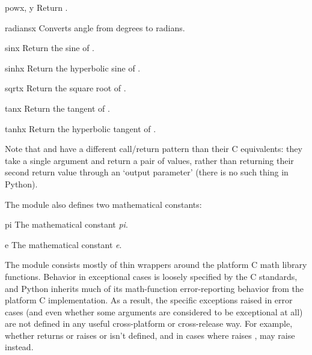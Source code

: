 \begin{funcdesc}{pow}{x, y}
Return .
\end{funcdesc}

\begin{funcdesc}{radians}{x}
Converts angle  from degrees to radians.
\end{funcdesc}

\begin{funcdesc}{sin}{x}
Return the sine of .
\end{funcdesc}

\begin{funcdesc}{sinh}{x}
Return the hyperbolic sine of .
\end{funcdesc}

\begin{funcdesc}{sqrt}{x}
Return the square root of .
\end{funcdesc}

\begin{funcdesc}{tan}{x}
Return the tangent of .
\end{funcdesc}

\begin{funcdesc}{tanh}{x}
Return the hyperbolic tangent of .
\end{funcdesc}

Note that  and  have a different
call/return pattern than their C equivalents: they take a single
argument and return a pair of values, rather than returning their
second return value through an `output parameter' (there is no such
thing in Python).

The module also defines two mathematical constants:

\begin{datadesc}{pi}
The mathematical constant \emph{pi}.
\end{datadesc}

\begin{datadesc}{e}
The mathematical constant \emph{e}.
\end{datadesc}

\begin{notice}
  The  module consists mostly of thin wrappers around
  the platform C math library functions.  Behavior in exceptional cases is
  loosely specified by the C standards, and Python inherits much of its
  math-function error-reporting behavior from the platform C
  implementation.  As a result,
  the specific exceptions raised in error cases (and even whether some
  arguments are considered to be exceptional at all) are not defined in any
  useful cross-platform or cross-release way.  For example, whether
   returns  or raises  or
   isn't defined, and in
  cases where  raises ,
   may raise  instead.
\end{notice}

\begin{seealso}
\end{seealso}

